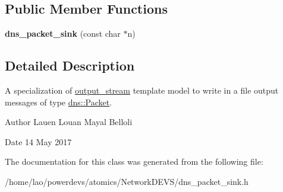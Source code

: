 \subsection*{Public Member Functions}
\begin{DoxyCompactItemize}
\item 
{\bfseries dns\+\_\+packet\+\_\+sink} (const char $\ast$n)\hypertarget{classdns__packet__sink_a2ead1895f1847c995f3bed2c10fe52e9}{}\label{classdns__packet__sink_a2ead1895f1847c995f3bed2c10fe52e9}

\end{DoxyCompactItemize}


\subsection{Detailed Description}
A specialization of \hyperlink{classoutput__stream}{output\+\_\+stream} template model to write in a file output messages of type \hyperlink{structdns_1_1Packet}{dns\+::\+Packet}. 

\begin{DoxyAuthor}{Author}
Lauen Louan Mayal Belloli 
\end{DoxyAuthor}
\begin{DoxyDate}{Date}
14 May 2017 
\end{DoxyDate}


The documentation for this class was generated from the following file\+:\begin{DoxyCompactItemize}
\item 
/home/lao/powerdevs/atomics/\+Network\+D\+E\+V\+S/dns\+\_\+packet\+\_\+sink.\+h\end{DoxyCompactItemize}
